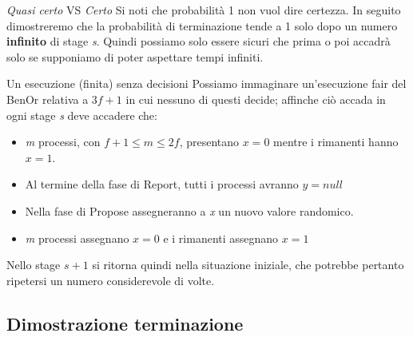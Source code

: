 \documentclass{beamer}
\begin{document}
\begin{frame}{\textit{Quasi certo} VS \textit{Certo}}
    Si noti che probabilità 1 non vuol dire certezza. In seguito dimostreremo che la probabilità di terminazione tende a 1 solo dopo un numero \textbf{infinito} di stage \textit{s}. Quindi possiamo solo essere sicuri che prima o poi accadrà solo se supponiamo di poter aspettare tempi infiniti.
\end{frame}

\begin{frame}{Un esecuzione (finita) senza decisioni}
    Possiamo immaginare un'esecuzione fair del BenOr relativa a $3f+1$ in cui nessuno di questi decide; affinche ciò accada in ogni stage \textit{s} deve accadere che:
    \begin{itemize}
        \item \textit{m} processi, con $f+1 \leq m \leq 2f$, presentano $x = 0$ mentre i rimanenti hanno $x = 1$.
        \item Al termine della fase di Report, tutti i processi avranno $y = null$ %
        \item Nella fase di Propose assegneranno a \textit{x} un nuovo valore randomico.
        \item \textit{m} processi assegnano $x = 0$ e i rimanenti assegnano $x = 1$
    \end{itemize}
    Nello stage $s + 1$ si ritorna quindi nella situazione iniziale, che potrebbe pertanto ripetersi un numero considerevole di volte.
\end{frame}

\subsection{Dimostrazione terminazione}

\end{document}
